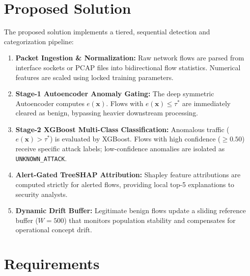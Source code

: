 \documentclass[12pt,a4paper]{report}
\begin{document}
\section{Proposed Solution}
The proposed solution implements a tiered, sequential detection and categorization pipeline:
\begin{enumerate}
    \item \textbf{Packet Ingestion \& Normalization:} Raw network flows are parsed from interface sockets or PCAP files into bidirectional flow statistics. Numerical features are scaled using locked training parameters.
    \item \textbf{Stage-1 Autoencoder Anomaly Gating:} The deep symmetric Autoencoder computes $e(\mathbf{x})$. Flows with $e(\mathbf{x}) \le \tau^*$ are immediately cleared as benign, bypassing heavier downstream processing.
    \item \textbf{Stage-2 XGBoost Multi-Class Classification:} Anomalous traffic ($e(\mathbf{x}) > \tau^*$) is evaluated by XGBoost. Flows with high confidence ($\ge 0.50$) receive specific attack labels; low-confidence anomalies are isolated as \texttt{UNKNOWN\_ATTACK}.
    \item \textbf{Alert-Gated TreeSHAP Attribution:} Shapley feature attributions are computed strictly for alerted flows, providing local top-5 explanations to security analysts.
    \item \textbf{Dynamic Drift Buffer:} Legitimate benign flows update a sliding reference buffer ($W=500$) that monitors population stability and compensates for operational concept drift.
\end{enumerate}

\section{Requirements}
\end{document}
